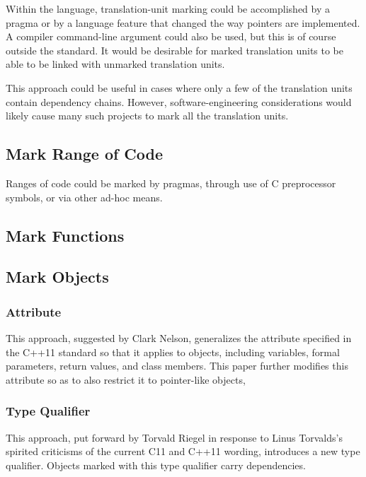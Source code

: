 \documentclass[letterpaper,twocolumn,10pt]{article}
\begin{document}
Within the language, translation-unit marking could be accomplished by
a pragma or by a language feature that changed the way pointers are
implemented.
A compiler command-line argument could also be used, but this is of
course outside the standard.
It would be desirable for marked translation units to be able to
be linked with unmarked translation units.

This approach could be useful in cases where only a few of the translation
units contain dependency chains.
However, software-engineering considerations would likely cause many such
projects to mark all the translation units.

\subsection{Mark Range of Code}
\label{sec:Mark Range of Code}

Ranges of code could be marked by pragmas, through use of C preprocessor
symbols, or via other ad-hoc means.

\subsection{Mark Functions}
\label{sec:Mark Functions}

\subsection{Mark Objects}
\label{sec:Mark Objects}

\subsubsection{Attribute}
\label{sec:Attribute}

This approach, suggested by Clark Nelson, generalizes the
 attribute specified in the C++11 standard
so that it applies to objects, including variables, formal parameters,
return values, and class members.
This paper further modifies this attribute so as to also restrict
it to pointer-like objects,

\subsubsection{Type Qualifier}
\label{sec:Type Qualifier}

This approach, put forward by Torvald Riegel in response to
Linus Torvalds's spirited criticisms of the current C11 and C++11
wording, introduces a new  type qualifier.
Objects marked with this type qualifier carry dependencies.
\end{document}
